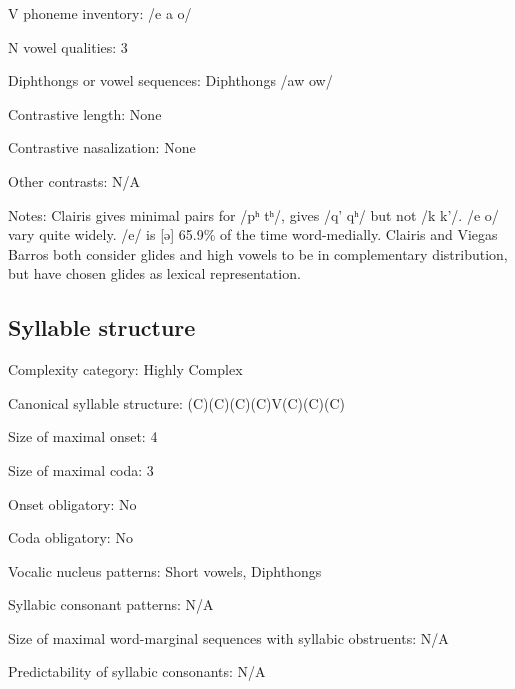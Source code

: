 {\begin{appendixdesc}
\item[V phoneme inventory:] /e a o/

\item[N vowel qualities:] 3

\item[Diphthongs or vowel sequences:] Diphthongs /aw ow/

\item[Contrastive length:] None

\item[Contrastive nasalization:] None

\item[Other contrasts:] N/A

\item[Notes:] Clairis gives minimal pairs for /pʰ tʰ/, gives /q’ qʰ/ but not /k k’/. /e o/ vary quite widely. /e/ is [ə] 65.9\% of the time word-medially. Clairis and Viegas Barros both consider glides and high vowels to be in complementary distribution, but have chosen glides as lexical representation.
\end{appendixdesc}
\subsection*{Syllable structure}
\begin{appendixdesc}
\item[Complexity category:] Highly Complex

\item[Canonical syllable structure:] (C)(C)(C)(C)V(C)(C)(C) \citep[391--401]{Clairis1985}

\item[Size of maximal onset:] 4

\item[Size of maximal coda:] 3

\item[Onset obligatory:] No

\item[Coda obligatory:] No

\item[Vocalic nucleus patterns:] Short vowels, Diphthongs

\item[Syllabic consonant patterns:] N/A

\item[Size of maximal word-marginal sequences with syllabic obstruents:] N/A

\item[Predictability of syllabic consonants:] N/A 


\end{appendixdesc}}
